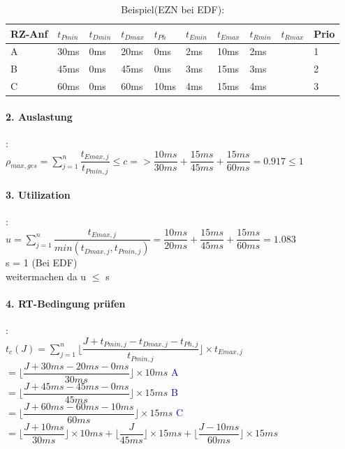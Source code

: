 \documentclass[12pt,a4paper,oneside,ngerman]{article}
\begin{document}
\begin{table}[H]
	\caption{Beispiel(EZN bei EDF):}
	\begin{tabular}{|l|l|l|l|l|l|l|l|l|l|}
	\hline
	RZ-Anf & \(t_{Pmin}\) & \(t_{Dmin}\) & \(t_{Dmax}\) & \(t_{Ph}\) & \(t_{Emin}\) & \(t_{Emax}\) & \(t_{Rmin}\) & \(t_{Rmax}\) & Prio \\ \hline
	A      & 30ms         & 0ms          & 20ms         & 0ms        & 2ms          & 10ms         & 2ms          &              & 1    \\ \hline
	B      & 45ms         & 0ms          & 45ms         & 0ms        & 3ms          & 15ms         & 3ms          &              & 2    \\ \hline
	C      & 60ms         & 0ms          & 60ms         & 10ms       & 4ms          & 15ms         & 4ms          &              & 3    \\ \hline
	\end{tabular}
\end{table}

\paragraph{2. Auslastung}: \\
\(\rho_{max,ges} = \displaystyle\sum_{j=1}^n \dfrac{t_{Emax,j}}{t_{Pmin,j}} \leq c => \dfrac{10ms}{30ms} + \dfrac{15ms}{45ms} + \dfrac{15ms}{60ms} = 0.917 \leq 1\)\\

\paragraph{3. Utilization}: \\
\(u = \displaystyle\sum_{j=1}^n \dfrac{t_{Emax,j}}{ min(t_{Dmax,j}, t_{Pmin,j})}  =  \dfrac{10ms}{20ms} + \dfrac{15ms}{45ms} + \dfrac{15ms}{60ms} = 1.083 \)\\
s = 1 (Bei EDF)\\
weitermachen da u $\leq$ s\\

\paragraph{4. RT-Bedingung prüfen}:\\

\(t_{c}(J) = \displaystyle\sum_{j=1}^n \Big\lfloor \dfrac{J + t_{Pmin,j} - t_{Dmax,j} - t_{Ph,j} }{ t_{Pmin,j} } \Big\rfloor \times t_{Emax,j}\) \\
\(= \Big\lfloor \dfrac{J + 30ms - 20ms - 0ms }{ 30ms } \Big\rfloor \times 10ms\) \textcolor{blue}{A} \\
\(= \Big\lfloor \dfrac{J + 45ms - 45ms - 0ms }{ 45ms } \Big\rfloor \times 15ms\) \textcolor{blue}{B} \\
\(= \Big\lfloor \dfrac{J + 60ms - 60ms - 10ms }{ 60ms } \Big\rfloor \times 15ms\) \textcolor{blue}{C} \\
\(= \Big\lfloor \dfrac{J + 10ms }{ 30ms } \Big\rfloor \times 10ms + \Big\lfloor \dfrac{J}{ 45ms } \Big\rfloor \times 15ms + \Big\lfloor \dfrac{J - 10ms }{ 60ms } \Big\rfloor \times 15ms\)\\
\end{document}
